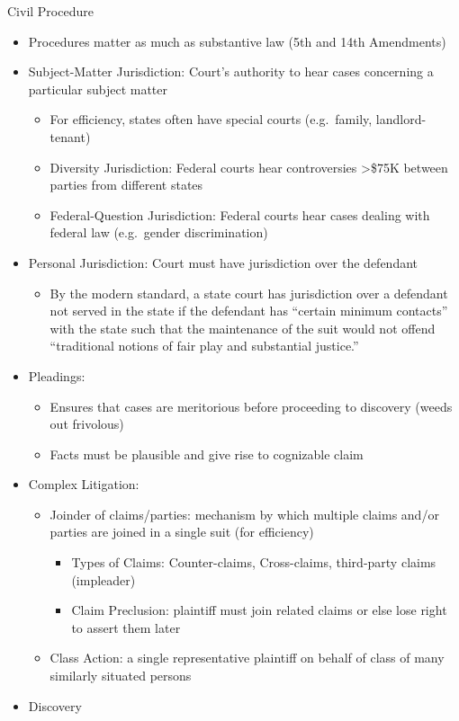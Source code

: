 \documentclass[
]{article}
\providecommand{\tightlist}{%
  \setlength{\itemsep}{0pt}\setlength{\parskip}{0pt}}
\begin{document}
Civil Procedure

\begin{itemize}
\item
  Procedures matter as much as substantive law (5th and 14th Amendments)
\item
  Subject-Matter Jurisdiction: Court's authority to hear cases
  concerning a particular subject matter

  \begin{itemize}
  \item
    For efficiency, states often have special courts (e.g.~family,
    landlord-tenant)
  \item
    Diversity Jurisdiction: Federal courts hear controversies
    \textgreater\$75K between parties from different states
  \item
    Federal-Question Jurisdiction: Federal courts hear cases dealing
    with federal law (e.g.~gender discrimination)
  \end{itemize}
\item
  Personal Jurisdiction: Court must have jurisdiction over the defendant

  \begin{itemize}
  \tightlist
  \item
    By the modern standard, a state court has jurisdiction over a
    defendant not served in the state if the defendant has ``certain
    minimum contacts'' with the state such that the maintenance of the
    suit would not offend ``traditional notions of fair play and
    substantial justice.''
  \end{itemize}
\item
  Pleadings:

  \begin{itemize}
  \item
    Ensures that cases are meritorious before proceeding to discovery
    (weeds out frivolous)
  \item
    Facts must be plausible and give rise to cognizable claim
  \end{itemize}
\item
  Complex Litigation:

  \begin{itemize}
  \item
    Joinder of claims/parties: mechanism by which multiple claims and/or
    parties are joined in a single suit (for efficiency)

    \begin{itemize}
    \item
      Types of Claims: Counter-claims, Cross-claims, third-party claims
      (impleader)
    \item
      Claim Preclusion: plaintiff must join related claims or else lose
      right to assert them later
    \end{itemize}
  \item
    Class Action: a single representative plaintiff on behalf of class
    of many similarly situated persons
  \end{itemize}
\item
  Discovery


\end{itemize}
\end{document}
